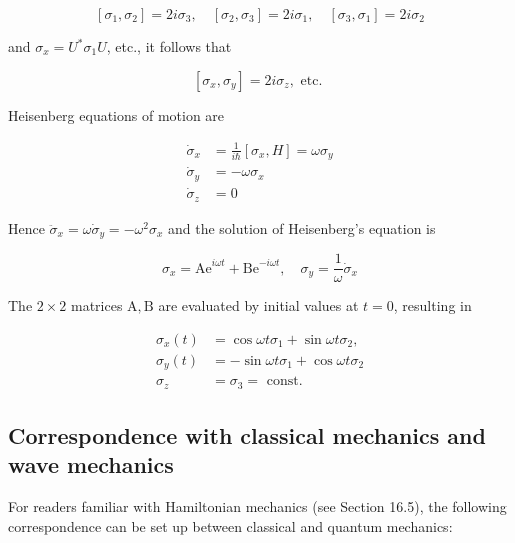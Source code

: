 \documentclass[10pt]{article}
\begin{document}
$$
\left[\sigma_{1}, \sigma_{2}\right]=2 i \sigma_{3}, \quad\left[\sigma_{2}, \sigma_{3}\right]=2 i \sigma_{1}, \quad\left[\sigma_{3}, \sigma_{1}\right]=2 i \sigma_{2}
$$

and $\sigma_{x}=U^{*} \sigma_{1} U$, etc., it follows that

$$
\left[\sigma_{x}, \sigma_{y}\right]=2 i \sigma_{z}, \text { etc. }
$$

Heisenberg equations of motion are

$$
\begin{aligned}
\dot{\sigma}_{x} & =\frac{1}{i \hbar}\left[\sigma_{x}, H\right]=\omega \sigma_{y} \\
\dot{\sigma}_{y} & =-\omega \sigma_{x} \\
\dot{\sigma}_{z} & =0
\end{aligned}
$$

Hence $\ddot{\sigma}_{x}=\omega \dot{\sigma}_{y}=-\omega^{2} \sigma_{x}$ and the solution of Heisenberg's equation is

$$
\sigma_{x}=\mathrm{Ae}^{i \omega t}+\mathrm{Be}^{-i \omega t}, \quad \sigma_{y}=\frac{1}{\omega} \dot{\sigma}_{x}
$$

The $2 \times 2$ matrices $\mathrm{A}, \mathrm{B}$ are evaluated by initial values at $t=0$, resulting in

$$
\begin{aligned}
\sigma_{x}(t) & =\cos \omega t \sigma_{1}+\sin \omega t \sigma_{2}, \\
\sigma_{y}(t) & =-\sin \omega t \sigma_{1}+\cos \omega t \sigma_{2} \\
\sigma_{z} & =\sigma_{3}=\text { const. }
\end{aligned}
$$

\subsection{Correspondence with classical mechanics and wave mechanics}
For readers familiar with Hamiltonian mechanics (see Section 16.5), the following correspondence can be set up between classical and quantum mechanics:
\end{document}
